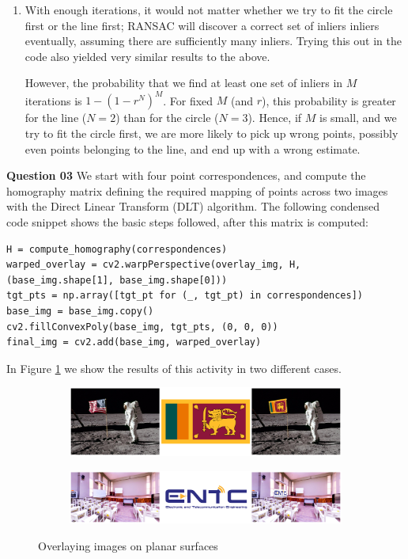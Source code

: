 \documentclass{article}[a4paper]
\begin{document}
\begin{enumerate}
		\item With enough iterations, it would not matter whether we try to fit the circle first or the line first; RANSAC will discover a correct set of inliers inliers eventually, assuming there are sufficiently many inliers. Trying this out in the code also yielded very similar results to the above.
		
		However, the probability that we find at least one set of inliers in $M$ iterations is $1 - \left(1 - r^N\right)^M$. For fixed $M$ (and $r$), this probability is greater for the line ($N=2$) than for the circle ($N=3$). Hence, if $M$ is small, and we try to fit the circle first, we are more likely to pick up wrong points, possibly even points belonging to the line, and end up with a wrong estimate.
	\end{enumerate}
    
    \textbf{Question 03} We start with four point correspondences, and compute the homography matrix defining the required mapping of points across two images with the Direct Linear Transform (DLT) algorithm. The following condensed code snippet shows the basic steps followed, after this matrix is computed:
	\begin{lstlisting}
H = compute_homography(correspondences)
warped_overlay = cv2.warpPerspective(overlay_img, H, (base_img.shape[1], base_img.shape[0]))
tgt_pts = np.array([tgt_pt for (_, tgt_pt) in correspondences])
base_img = base_img.copy()
cv2.fillConvexPoly(base_img, tgt_pts, (0, 0, 0))
final_img = cv2.add(base_img, warped_overlay)
	\end{lstlisting}

	In Figure \ref{q3} we show the results of this activity in two different cases.

	\begin{figure}[H]
		\centering
		\begin{subfigure}{\textwidth}
			\centering
			\includegraphics[width=\textwidth]{imgs/q31.png}
		\end{subfigure}
		\begin{subfigure}{\textwidth}
			\centering
			\includegraphics[width=\textwidth]{imgs/q32.png}
		\end{subfigure}
		\caption{Overlaying images on planar surfaces}
		\label{q3}
	\end{figure}
\end{document}
